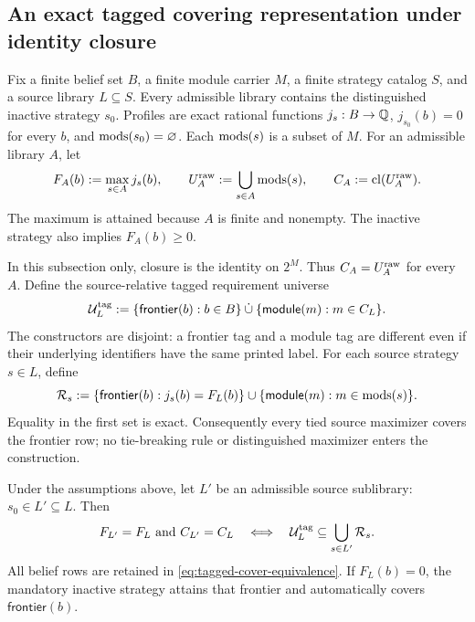 
\subsection{An exact tagged covering representation under identity closure}
\label{subsec:aor-tagged-cover}

Fix a finite belief set \(B\), a finite module carrier \(M\), a finite
strategy catalog \(S\), and a source library \(L\subseteq S\).  Every
admissible library contains the distinguished inactive strategy \(s_0\).
Profiles are exact rational functions \(j_s:B\to\mathbb{Q}\),
\(j_{s_0}(b)=0\) for every \(b\), and \(\operatorname{mods}(s_0)=\varnothing\).  Each
\(\operatorname{mods}(s)\) is a subset of \(M\).  For an admissible library \(A\), let
\[
 F_A(b):=\max_{s\in A}j_s(b),\qquad
 U_A^{\rm raw}:=\bigcup_{s\in A}\operatorname{mods}(s),\qquad
 C_A:=\operatorname{cl}(U_A^{\rm raw}).
\]
The maximum is attained because \(A\) is finite and nonempty.  The inactive
strategy also implies \(F_A(b)\geq 0\).

In this subsection only, closure is the identity on \(2^M\).  Thus
\(C_A=U_A^{\rm raw}\) for every \(A\).  Define the source-relative tagged
requirement universe
\begin{equation}
 \mathcal U_L^{\rm tag}
 :=\{\mathsf{frontier}(b):b\in B\}
   \mathbin{\dot\cup}
   \{\mathsf{module}(m):m\in C_L\}.
 \label{eq:tagged-requirement-universe}
\end{equation}
The constructors are disjoint: a frontier tag and a module tag are different
even if their underlying identifiers have the same printed label.  For each
source strategy \(s\in L\), define
\begin{equation}
 \mathcal R_s
 :=\{\mathsf{frontier}(b):j_s(b)=F_L(b)\}
   \cup
   \{\mathsf{module}(m):m\in\operatorname{mods}(s)\}.
 \label{eq:strategy-tagged-coverage}
\end{equation}
Equality in the first set is exact.  Consequently every tied source
maximizer covers the frontier row; no tie-breaking rule or distinguished
maximizer enters the construction.

\begin{theorem}
\label{thm:aor-tagged-cover-equivalence}
Under the assumptions above, let \(L'\) be an admissible source sublibrary:
\(s_0\in L'\subseteq L\).  Then
\begin{equation}
 F_{L'}=F_L\ \text{and}\ C_{L'}=C_L
 \quad\Longleftrightarrow\quad
 \mathcal U_L^{\rm tag}\subseteq
       \bigcup_{s\in L'}\mathcal R_s.
 \label{eq:tagged-cover-equivalence}
\end{equation}
All belief rows are retained in \eqref{eq:tagged-cover-equivalence}.  If
\(F_L(b)=0\), the mandatory inactive strategy attains that frontier and
automatically covers \(\mathsf{frontier}(b)\).
\end{theorem}

